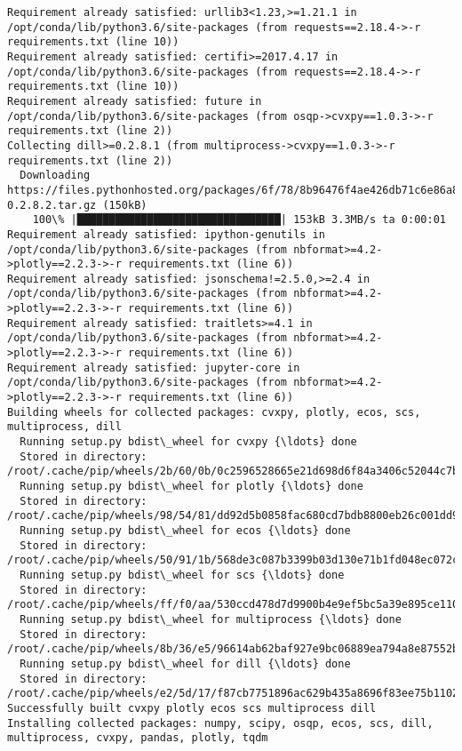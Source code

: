\documentclass[11pt]{article}
\begin{document}
\begin{Verbatim}[commandchars=\\\{\}]
Requirement already satisfied: urllib3<1.23,>=1.21.1 in /opt/conda/lib/python3.6/site-packages (from requests==2.18.4->-r requirements.txt (line 10))
Requirement already satisfied: certifi>=2017.4.17 in /opt/conda/lib/python3.6/site-packages (from requests==2.18.4->-r requirements.txt (line 10))
Requirement already satisfied: future in /opt/conda/lib/python3.6/site-packages (from osqp->cvxpy==1.0.3->-r requirements.txt (line 2))
Collecting dill>=0.2.8.1 (from multiprocess->cvxpy==1.0.3->-r requirements.txt (line 2))
  Downloading https://files.pythonhosted.org/packages/6f/78/8b96476f4ae426db71c6e86a8e6a81407f015b34547e442291cd397b18f3/dill-0.2.8.2.tar.gz (150kB)
    100\% |████████████████████████████████| 153kB 3.3MB/s ta 0:00:01
Requirement already satisfied: ipython-genutils in /opt/conda/lib/python3.6/site-packages (from nbformat>=4.2->plotly==2.2.3->-r requirements.txt (line 6))
Requirement already satisfied: jsonschema!=2.5.0,>=2.4 in /opt/conda/lib/python3.6/site-packages (from nbformat>=4.2->plotly==2.2.3->-r requirements.txt (line 6))
Requirement already satisfied: traitlets>=4.1 in /opt/conda/lib/python3.6/site-packages (from nbformat>=4.2->plotly==2.2.3->-r requirements.txt (line 6))
Requirement already satisfied: jupyter-core in /opt/conda/lib/python3.6/site-packages (from nbformat>=4.2->plotly==2.2.3->-r requirements.txt (line 6))
Building wheels for collected packages: cvxpy, plotly, ecos, scs, multiprocess, dill
  Running setup.py bdist\_wheel for cvxpy {\ldots} done
  Stored in directory: /root/.cache/pip/wheels/2b/60/0b/0c2596528665e21d698d6f84a3406c52044c7b4ca6ac737cf3
  Running setup.py bdist\_wheel for plotly {\ldots} done
  Stored in directory: /root/.cache/pip/wheels/98/54/81/dd92d5b0858fac680cd7bdb8800eb26c001dd9f5dc8b1bc0ba
  Running setup.py bdist\_wheel for ecos {\ldots} done
  Stored in directory: /root/.cache/pip/wheels/50/91/1b/568de3c087b3399b03d130e71b1fd048ec072c45f72b6b6e9a
  Running setup.py bdist\_wheel for scs {\ldots} done
  Stored in directory: /root/.cache/pip/wheels/ff/f0/aa/530ccd478d7d9900b4e9ef5bc5a39e895ce110bed3d3ac653e
  Running setup.py bdist\_wheel for multiprocess {\ldots} done
  Stored in directory: /root/.cache/pip/wheels/8b/36/e5/96614ab62baf927e9bc06889ea794a8e87552b84bb6bf65e3e
  Running setup.py bdist\_wheel for dill {\ldots} done
  Stored in directory: /root/.cache/pip/wheels/e2/5d/17/f87cb7751896ac629b435a8696f83ee75b11029f5d6f6bda72
Successfully built cvxpy plotly ecos scs multiprocess dill
Installing collected packages: numpy, scipy, osqp, ecos, scs, dill, multiprocess, cvxpy, pandas, plotly, tqdm

\end{Verbatim}
\end{document}
